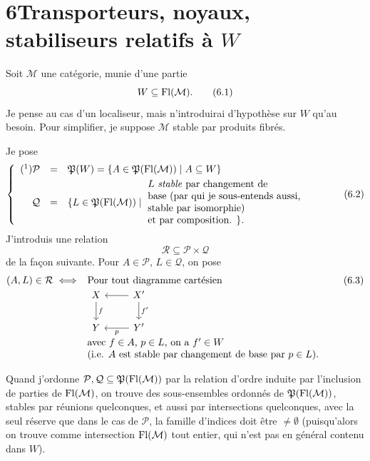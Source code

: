 \section*{6\quad Transporteurs, noyaux, stabiliseurs relatifs à $W$}

Soit $\mathcal{M}$ une catégorie, munie d'une partie
\[
W\subseteq\mathrm{Fl}(\mathcal{M}).
\tag*{(6.1)}
\]
Je pense au cas d'un localiseur, mais n'introduirai d'hypothèse sur $W$ qu'au besoin. Pour simplifier, je suppose $\mathcal{M}$ stable par produits fibrés.

Je pose
\[
\left\{
\begin{array}{rcl}
\mbox{(\footnotemark)}\mathcal{P} & = & \Pf(W)=\{A\in\Pf(\Fl(\mathcal{M}))\mid A\subseteq W\}\\[1ex]
\mathcal{Q} & = & \{L\in\Pf(\Fl(\mathcal{M}))\mid\
\parbox[c]{17em}{$L$ \textit{stable} par changement de\\
base (par qui je sous-entends aussi,\\
stable par isomorphie)\\
et par composition. $\}$.}
\end{array}
\right.
\tag*{(6.2)}
\]
J'introduis une relation
\[
\mathcal{R}\subseteq\mathcal{P}\times\mathcal{Q}
\]
de la façon suivante. Pour $A\in\mathcal{P}$, $L\in\mathcal{Q}$, on pose
\[
(A,L)\in\mathcal{R}\iff
\begin{array}[t]{l}
\text{Pour tout diagramme cartésien}\\
\begin{tikzcd}[ampersand replacement=\&]
X \arrow[d, "f"] \& X' \arrow[l] \arrow[d, "f'"] \\
Y \& Y' \arrow[l, "p"]
\end{tikzcd}\\
\text{avec $f\in A$, $p\in L$, on a $f'\in W$}\\
\text{(i.e. $A$ est stable par changement de base par $p\in L$).}
\end{array}
\tag*{(6.3)}
\]

Quand j'ordonne $\mathcal{P},\mathcal{Q}\subseteq\mathfrak{P}(\mathrm{Fl}(\mathcal{M}))$ par la relation d'ordre induite par l'inclusion de parties de $\mathrm{Fl}(\mathcal{M})$, on trouve des sous-ensembles ordonnés de $\mathfrak{P}(\mathrm{Fl}(\mathcal{M}))$, stables par réunions quelconques, et aussi par intersections quelconques, avec la seul réserve que dans le cas de $\mathcal{P}$, la famille d'indices doit être $\neq\emptyset$ (puisqu'alors on trouve comme intersection $\mathrm{Fl}(\mathcal{M})$ tout entier, qui n'est pas en général contenu dans $W$). %

